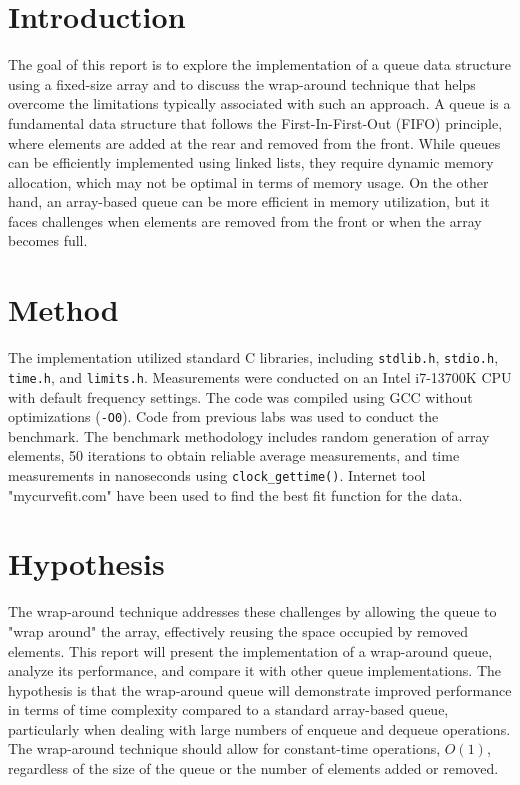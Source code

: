 
\section*{Introduction}
The goal of this report is to explore the implementation of a queue data structure using a fixed-size array and to discuss the wrap-around technique that helps overcome the limitations typically associated with such an approach. A queue is a fundamental data structure that follows the First-In-First-Out (FIFO) principle, where elements are added at the rear and removed from the front. While queues can be efficiently implemented using linked lists, they require dynamic memory allocation, which may not be optimal in terms of memory usage. On the other hand, an array-based queue can be more efficient in memory utilization, but it faces challenges when elements are removed from the front or when the array becomes full. 


\section*{Method}
The implementation utilized standard C libraries, including \texttt{stdlib.h}, \texttt{stdio.h}, \texttt{time.h}, and \texttt{limits.h}. Measurements were conducted on an Intel i7-13700K CPU with default frequency settings. The code was compiled using GCC without optimizations (\texttt{-O0}). Code from previous labs was used to conduct the benchmark. The benchmark methodology includes random generation of array elements, 50 iterations to obtain reliable average measurements, and time measurements in nanoseconds using \texttt{clock\_gettime()}. Internet tool "mycurvefit.com" have been used to find the best fit function for the data.

\section*{Hypothesis}
The wrap-around technique addresses these challenges by allowing the queue to "wrap around" the array, effectively reusing the space occupied by removed elements. This report will present the implementation of a wrap-around queue, analyze its performance, and compare it with other queue implementations. The hypothesis is that the wrap-around queue will demonstrate improved performance in terms of time complexity compared to a standard array-based queue, particularly when dealing with large numbers of enqueue and dequeue operations. The wrap-around technique should allow for constant-time operations, $O(1)$, regardless of the size of the queue or the number of elements added or removed.

